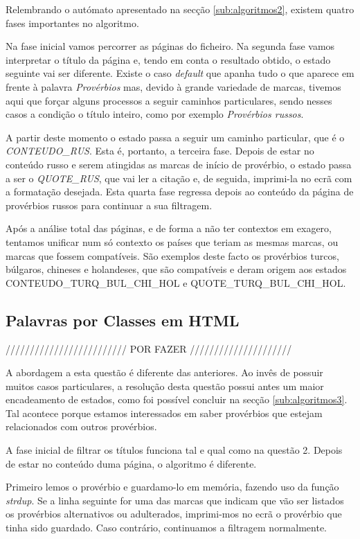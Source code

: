 \documentclass[11pt,a4paper]{report}
\begin{document}
Relembrando o autómato apresentado na secção \ref{sub:algoritmos2}, existem quatro fases importantes no algoritmo.

Na fase inicial vamos percorrer as páginas do ficheiro. Na segunda fase vamos interpretar o título da página e, tendo em conta o resultado obtido, o estado seguinte vai ser diferente. Existe o caso \textit{default} que apanha tudo o que aparece em frente à palavra \textit{Provérbios} mas, devido à grande variedade de marcas, tivemos aqui que forçar alguns processos a seguir caminhos particulares, sendo nesses casos a condição o título inteiro, como por exemplo \textit{Provérbios russos}.

A partir deste momento o estado passa a seguir um caminho particular, que é o \textit{CONTEUDO\_RUS}. Esta é, portanto, a terceira fase. Depois de estar no conteúdo russo e serem atingidas as marcas de início de provérbio, o estado passa a ser o \textit{QUOTE\_RUS}, que vai ler a citação e, de seguida, imprimi-la no ecrã com a formatação desejada. Esta quarta fase regressa depois ao conteúdo da página de provérbios russos para continuar a sua filtragem.

Após a análise total das páginas, e de forma a não ter contextos em exagero, tentamos unificar num só contexto os países que teriam as mesmas marcas, ou marcas que fossem compatíveis. São exemplos deste facto os provérbios turcos, búlgaros, chineses e holandeses, que são compatíveis e deram origem aos estados CONTEUDO\_TURQ\_BUL\_CHI\_HOL e QUOTE\_TURQ\_BUL\_CHI\_HOL.


\newpage

\subsection{Palavras por Classes em HTML}

///////////////////////// POR FAZER /////////////////////

A abordagem a esta questão é diferente das anteriores. Ao invês de possuir muitos casos particulares, a resolução desta questão possui antes um maior encadeamento de estados, como foi possível concluir na secção \ref{sub:algoritmos3}. Tal acontece porque estamos interessados em saber provérbios que estejam relacionados com outros provérbios.

A fase inicial de filtrar os títulos funciona tal e qual como na questão 2. Depois de estar no conteúdo duma página, o algoritmo é diferente.

Primeiro lemos o provérbio e guardamo-lo em memória, fazendo uso da função \textit{strdup}. Se a linha seguinte for uma das marcas que indicam que vão ser listados os provérbios alternativos ou adulterados, imprimi-mos no ecrã o provérbio que tinha sido guardado. Caso contrário, continuamos a filtragem normalmente.
\end{document}
